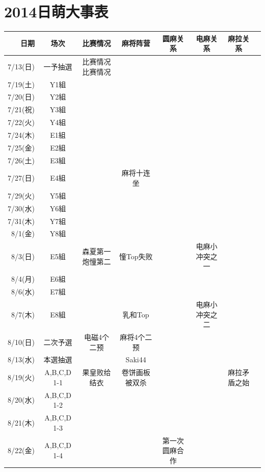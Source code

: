 \chapter*{2014日萌大事表}

{\renewcommand{}\selectfont
{}
\begin{longtable}{rccccccc}
\hline
	\bf 日期 & \bf 场次 & \bf 比赛情况 & \bf 麻将阵营 & \bf 圆麻关系 & \bf 电麻关系 & \bf 麻拉关系\\ \hline
	7/13(日) & 一予抽選 & {\color{white}比赛情况比赛情况} &  &  &  &\\ \hline
	7/19(土) & Y1組 &  &  &  &  &\\ \hline
	7/20(日) & Y2組 &  &  &  &  &\\ \hline
	7/21(祝) & Y3組 &  &  &  &  &\\ \hline
	7/22(火) & Y4組 &  &  &  &  &\\ \hline
	7/24(木) & E1組 &  &  &  &  &\\ \hline
	7/25(金) & E2組 &  &  &  &  &\\ \hline
	7/26(土) & E3組 &  &  &  &  &\\ \hline
	7/27(日) & E4組 &  & 麻将十连坐 &  &  &\\ \hline
	7/29(火) & Y5組 &  &  &  &  &\\ \hline
	7/30(水) & Y6組 &  &  &  &  &\\ \hline
	7/31(木) & Y7組 &  &  &  &  &\\ \hline
	8/1(金) & Y8組 &  &  &  &  &\\ \hline
	8/3(日) & E5組 & 森夏第一 炮憧第二 & 憧Top失败 &  & 电麻小冲突之一 &\\ \hline
	8/4(月) & E6組 &  &  &  &  &\\ \hline
	8/6(水) & E7組 &  &  &  &  &\\ \hline
	8/7(木) & E8組 &  & 乳和Top &  & 电麻小冲突之二 &\\ \hline
	8/10(日) & 二次予選 & 电磁4个二预 & 麻将4个二预 &  &  &\\ \hline
	8/13(水) & 本選抽選 &  & Saki44 &  &  &\\ \hline
	8/19(火) & A,B,C,D 1-1 & 果皇败给结衣 & 卷饼画板被双杀 &  &  & 麻拉矛盾之始\\ \hline
	8/20(水) & A,B,C,D 1-2 &  &  &  &  &\\ \hline
	8/21(木) & A,B,C,D 1-3 &  &  &  &  &\\ \hline
	8/22(金) & A,B,C,D 1-4 &  &  & 第一次圆麻合作 &  &\\ \hline

\end{longtable}}

